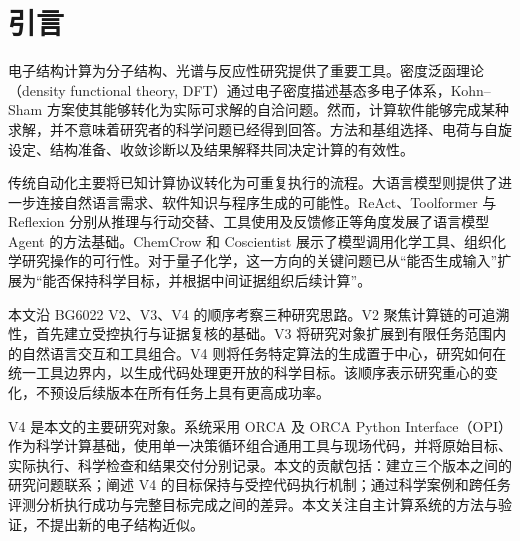 \section{引言}
电子结构计算为分子结构、光谱与反应性研究提供了重要工具。密度泛函理论（density functional theory, DFT）通过电子密度描述基态多电子体系，Kohn--Sham 方案使其能够转化为实际可求解的自洽问题\cite{hk,ks}。然而，计算软件能够完成某种求解，并不意味着研究者的科学问题已经得到回答。方法和基组选择、电荷与自旋设定、结构准备、收敛诊断以及结果解释共同决定计算的有效性。

传统自动化主要将已知计算协议转化为可重复执行的流程。大语言模型则提供了进一步连接自然语言需求、软件知识与程序生成的可能性。ReAct、Toolformer 与 Reflexion 分别从推理与行动交替、工具使用及反馈修正等角度发展了语言模型 Agent 的方法基础\cite{react,toolformer,reflexion}。ChemCrow 和 Coscientist 展示了模型调用化学工具、组织化学研究操作的可行性\cite{chemcrow,coscientist}。对于量子化学，这一方向的关键问题已从“能否生成输入”扩展为“能否保持科学目标，并根据中间证据组织后续计算”。

本文沿 BG6022 V2、V3、V4 的顺序考察三种研究思路。V2 聚焦计算链的可追溯性，首先建立受控执行与证据复核的基础。V3 将研究对象扩展到有限任务范围内的自然语言交互和工具组合。V4 则将任务特定算法的生成置于中心，研究如何在统一工具边界内，以生成代码处理更开放的科学目标。该顺序表示研究重心的变化，不预设后续版本在所有任务上具有更高成功率。

V4 是本文的主要研究对象。系统采用 ORCA 及 ORCA Python Interface（OPI）作为科学计算基础\cite{orca2020,orca6,opipaper}，使用单一决策循环组合通用工具与现场代码，并将原始目标、实际执行、科学检查和结果交付分别记录。本文的贡献包括：建立三个版本之间的研究问题联系；阐述 V4 的目标保持与受控代码执行机制；通过科学案例和跨任务评测分析执行成功与完整目标完成之间的差异。本文关注自主计算系统的方法与验证，不提出新的电子结构近似。
